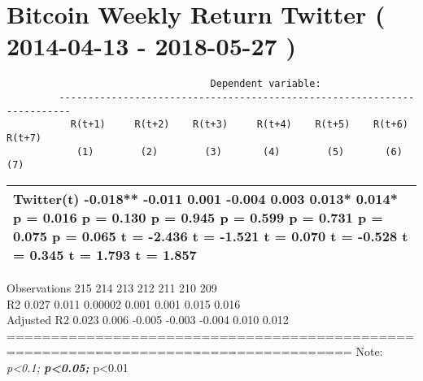 \documentclass[
]{article}
\newenvironment{Shaded}{\begin{snugshade}}{\end{snugshade}}
\newcommand{\DataTypeTok}[1]{\textcolor[rgb]{0.13,0.29,0.53}{#1}}
\newcommand{\KeywordTok}[1]{\textcolor[rgb]{0.13,0.29,0.53}{\textbf{#1}}}
\newcommand{\NormalTok}[1]{#1}
\newcommand{\OperatorTok}[1]{\textcolor[rgb]{0.81,0.36,0.00}{\textbf{#1}}}
\newcommand{\StringTok}[1]{\textcolor[rgb]{0.31,0.60,0.02}{#1}}
\begin{document}
\hypertarget{bitcoin-weekly-return-twitter-2014-04-13---2018-05-27}{%
\section{Bitcoin Weekly Return Twitter ( 2014-04-13 - 2018-05-27
)}\label{bitcoin-weekly-return-twitter-2014-04-13---2018-05-27}}

\begin{verbatim}
                                   Dependent variable:                           
         ------------------------------------------------------------------------
           R(t+1)     R(t+2)    R(t+3)     R(t+4)    R(t+5)    R(t+6)    R(t+7)  
            (1)        (2)        (3)       (4)        (5)       (6)       (7)   
\end{verbatim}

\begin{longtable}[]{@{}l@{}}
\toprule
\endhead
\begin{minipage}[t]{0.97\columnwidth}\raggedright
Twitter(t) -0.018** -0.011 0.001 -0.004 0.003 0.013* 0.014* p = 0.016 p
= 0.130 p = 0.945 p = 0.599 p = 0.731 p = 0.075 p = 0.065 t = -2.436 t =
-1.521 t = 0.070 t = -0.528 t = 0.345 t = 1.793 t = 1.857\strut
\end{minipage}\tabularnewline
\bottomrule
\end{longtable}

Observations 215 214 213 212 211 210 209\\
R2 0.027 0.011 0.00002 0.001 0.001 0.015 0.016\\
Adjusted R2 0.023 0.006 -0.005 -0.003 -0.004 0.010 0.012\\
=====================================================================================
Note: \emph{p\textless0.1; \textbf{p\textless0.05; }}p\textless0.01

\begin{Shaded}
\end{Shaded}
\end{document}
